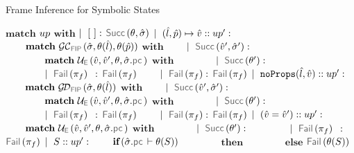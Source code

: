 {\small \begin{algorithm}[t!]
\caption{Frame Inference for Symbolic States}\label{fip:symb:states}
\begin{algorithmic}[1]
    \State $\textbf{match}$ $up$ $\textbf{with}$
    \State $\mid~[ \ ]:$ \Return $\success{\subst, \sstate}$
    \State $\mid~(\hat{l}, \hat{p}) \mapsto \hat{v} :: up' :$ 
    \State $\qquad \textbf{match} \ \GetCellV{\sstate, \subst(\sloc), \subst(\sexprp)}$ $\textbf{with}$
    \State $\qquad \mid~\success{\sexprv', \sstate'}:$
    \State $\qquad \qquad \textbf{match} \ \unifylexpr(\sexprv, \sexprv', \subst, \sstate.\pcsel)$ $\textbf{with}$
     \State $\qquad \qquad \mid~ \success{\subst'}:$ \Return {}
      \State $\qquad \qquad \mid~ \fail{\pc_f} \ \, :$ \Return $\fail{\pc_f}$
      \State $\qquad \mid~\fail{\pc_f}:$ \Return $\fail{\pc_f}$
     \State $\mid~\texttt{noProps}(\hat{l}, \hat{v}) :: up' :$  
       \State $\qquad \textbf{match} \ \GetDomainV{\sstate, \subst(\sloc)}$ $\textbf{with}$
       \State $\qquad \mid~\success{\sexprv', \sstate'}:$
         \State $\qquad \qquad \textbf{match} \ \unifylexpr(\sexprv, \sexprv', \subst, \sstate.\pcsel)$ $\textbf{with}$
       \State $\qquad \qquad \mid~ \success{\subst'}:$ \Return {}
       \State $\qquad \qquad \mid~ \fail{\pc_f} \ \, :$ \Return $\fail{\pc_f}$
       \State $\qquad \mid~\fail{\pc_f}:$ \Return $\fail{\pc_f}$
     \State $\mid~(\hat{v} = \hat{v}') :: up' :$  
        \State $\qquad \textbf{match} \ \unifylexpr(\sexprv, \sexprv', \subst, \sstate.\pcsel)$ $\textbf{with}$
         \State $\qquad \qquad \mid~ \success{\subst'}:$ \Return {}
       \State $\qquad \qquad \mid~ \fail{\pc_f} \ \, :$ \Return $\fail{\pc_f}$
     \State $\mid~S :: up' :$   
      \State $\qquad \textbf{if} \,(\sstate.\pcsel \vdash \subst(\sass))$
       \State $\qquad \qquad \textbf{then}$ \Return  {}
      \State $\qquad \qquad \textbf{else}$  \Return $\fail{\subst(\sass)}$
\EndFunction
\end{algorithmic}
\end{algorithm}}


